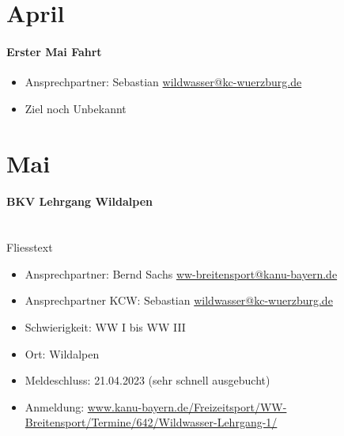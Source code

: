 \documentclass[12pt, a4paper]{report}
\begin{document}
\section*{April}\paragraph{Erster Mai Fahrt}
\begin{itemize}
    \item Ansprechpartner: Sebastian \href{mailto:wildwasser@kc-wuerzburg.de}{wildwasser@kc-wuerzburg.de}
    \item Ziel noch Unbekannt
\end{itemize}

\section*{Mai}\paragraph{BKV Lehrgang Wildalpen}
\mbox{}\\\mbox{}Fliesstext\begin{itemize}
    \item Ansprechpartner: Bernd Sachs \href{mailto:ww-breitensport@kanu-bayern.de}{ww-breitensport@kanu-bayern.de}
    \item Ansprechpartner KCW: Sebastian \href{mailto:wildwasser@kc-wuerzburg.de}{wildwasser@kc-wuerzburg.de}
    \item Schwierigkeit: WW I bis WW III
    \item Ort: Wildalpen
    \item Meldeschluss: 21.04.2023 (sehr schnell ausgebucht)
    \item Anmeldung: \url{www.kanu-bayern.de/Freizeitsport/WW-Breitensport/Termine/642/Wildwasser-Lehrgang-1/}
\end{itemize}
\end{document}

